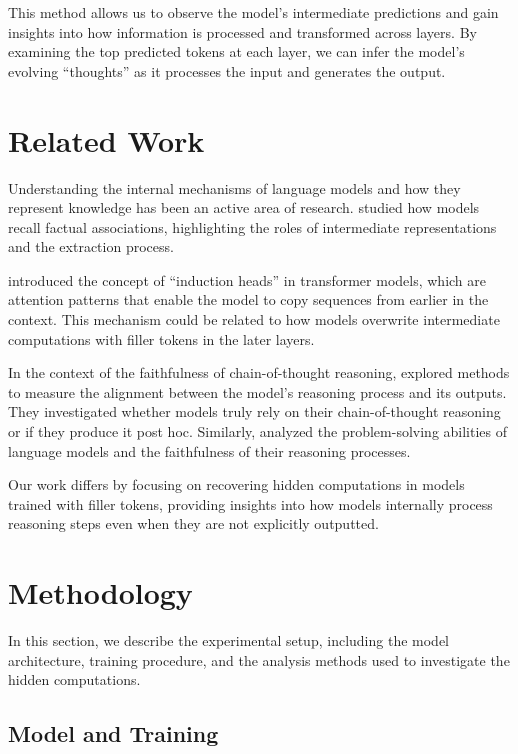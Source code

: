 \documentclass{article}
\begin{document}
This method allows us to observe the model's intermediate predictions and gain insights into how information is processed and transformed across layers. By examining the top predicted tokens at each layer, we can infer the model's evolving ``thoughts'' as it processes the input and generates the output.

\section{Related Work}

Understanding the internal mechanisms of language models and how they represent knowledge has been an active area of research. \cite{geva2020dissecting} studied how models recall factual associations, highlighting the roles of intermediate representations and the extraction process.

\cite{elhage2021mathematical} introduced the concept of ``induction heads'' in transformer models, which are attention patterns that enable the model to copy sequences from earlier in the context. This mechanism could be related to how models overwrite intermediate computations with filler tokens in the later layers.

In the context of the faithfulness of chain-of-thought reasoning, \cite{lanham2023measuring} explored methods to measure the alignment between the model's reasoning process and its outputs. They investigated whether models truly rely on their chain-of-thought reasoning or if they produce it post hoc. Similarly, \cite{turpin2023language} analyzed the problem-solving abilities of language models and the faithfulness of their reasoning processes.

Our work differs by focusing on recovering hidden computations in models trained with filler tokens, providing insights into how models internally process reasoning steps even when they are not explicitly outputted.

\section{Methodology}

In this section, we describe the experimental setup, including the model architecture, training procedure, and the analysis methods used to investigate the hidden computations.

\subsection{Model and Training}
\end{document}

